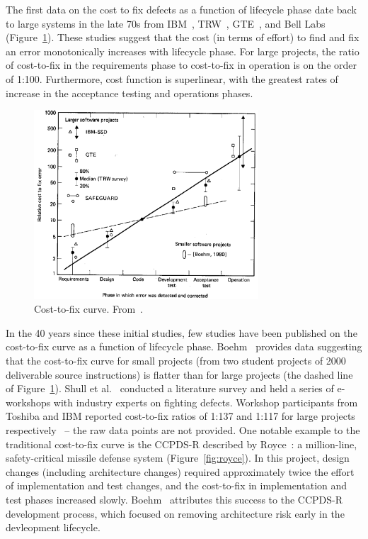 The first data on the cost to fix defects as a function of lifecycle phase date back to large systems in the late 70s from IBM~\cite{Fagan76}, TRW~\cite{Boehm76}, GTE~\cite{Daly77}, and Bell Labs~\cite{Stephenson76} (Figure~\ref{fig:cost-to-fix}). These studies suggest that the cost (in terms of effort) to find and fix an error monotonically increases with lifecycle phase. For large projects, the ratio of cost-to-fix in the requirements phase to cost-to-fix in operation is on the order of 1:100. Furthermore, cost function is superlinear, with the greatest rates of increase in the acceptance testing and operations phases.

\begin{figure}
 \includegraphics[width=3.3in]{boehm_cost-to-fix.png}
 \caption{Cost-to-fix curve. From~\cite{Boehm81}.}\label{fig:cost-to-fix}
 \end{figure}
 
In the 40 years since these initial studies, few studies have been published on the cost-to-fix curve as a function of lifecycle phase. Boehm~\cite{Boehm80} provides data suggesting that the cost-to-fix curve for small projects (from two student projects of 2000 deliverable source instructions) is flatter than for large projects (the dashed line of Figure~\ref{fig:cost-to-fix}). Shull et al.~\cite{Shull02} conducted a literature survey and held a series of e-workshops with industry experts on fighting defects. Workshop participants from Toshiba and IBM reported cost-to-fix ratios of 1:137 and 1:117 for large projects respectively~\cite{Shull02} -- the raw data points are not provided. One notable example to the traditional cost-to-fix curve is the CCPDS-R described by Royce~\cite{Royce98}: a million-line, safety-critical missile defense system (Figure~\ref{fig:royce}). In this project, design changes (including architecture changes) required approximately twice the effort of implementation and test changes, and the cost-to-fix in implementation and test phases increased slowly. Boehm~\cite{Boehm10} attributes this success to the CCPDS-R development process, which focused on removing architecture risk early in the devleopment lifecycle.

